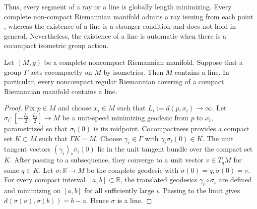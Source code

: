 \documentclass[11pt,twoside]{amsart}
\begin{document}
Thus, every segment of a ray or a line is globally length minimizing. 
Every complete non-compact Riemannian manifold admits a ray issuing from each point \cite[Lemma~7.3.1]{Petersen2016}, whereas the existence of a line is a stronger condition and does not hold in general. Nevertheless, the existence of a line is automatic when there is a cocompact isometric group action.

\begin{lemma}
\label{lem:cocompact-line}
Let $(M,g)$ be a complete noncompact Riemannian manifold. Suppose that a group $\Gamma$ acts cocompactly on $M$ by isometries. Then $M$ contains a line. In particular, every noncompact regular Riemannian covering of a compact Riemannian manifold contains a line.
\end{lemma}

\begin{proof}
Fix $p\in M$ and choose $x_i\in M$ such that
\(
    L_i:=d(p,x_i)\to\infty.
\)
Let
\(
    \sigma_i:
    [-\frac{L_i}{2},\frac{L_i}{2}]
    \to M
\)
be a unit-speed minimizing geodesic from $p$ to $x_i$, parametrized so that $\sigma_i(0)$ is its midpoint.
Cocompactness provides a compact set $K\subset M$ such that
\(
    \Gamma K=M.
\)
Choose $\gamma_i\in\Gamma$ with
\(
    \gamma_i\sigma_i(0)\in K.
\)
The unit tangent vectors
\(
    (\gamma_i)_*\dot{\sigma}_i(0)
\)
lie in the unit tangent bundle over the compact set $K$. After passing to a subsequence, they converge to a unit vector $v\in T_qM$ for some $q\in K$.
Let
\(
    \sigma:\mathbb{R}\to M
\)
be the complete geodesic with
\(
    \sigma(0)=q,
    \dot{\sigma}(0)=v.
\)
For every compact interval $[a,b]\subset\mathbb{R}$, the translated
geodesics $\gamma_i\circ\sigma_i$ are defined and minimizing on $[a,b]$ for all sufficiently large $i$. Passing to the limit gives
\(
    d(\sigma(a),\sigma(b))=b-a.
\)
Hence $\sigma$ is a line.
\end{proof}


\end{document}
